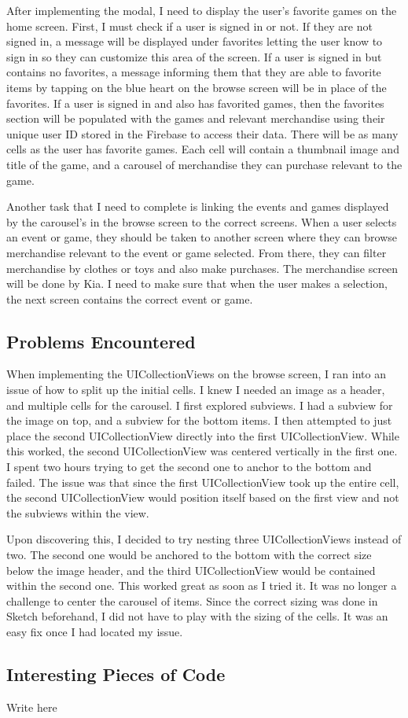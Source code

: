 \documentclass[onecolumn, draftclsnofoot,10pt, compsoc]{IEEEtran}
\begin{document}
\par After implementing the modal, I need to display the user’s favorite games on the home screen. First, I must check if a user is signed in or not. If they are not signed in, a message will be displayed under favorites letting the user know to sign in so they can customize this area of the screen. If a user is signed in but contains no favorites, a message informing them that they are able to favorite items by tapping on the blue heart on the browse screen will be in place of the favorites. If a user is signed in and also has favorited games, then the favorites section will be populated with the games and relevant merchandise using their unique user ID stored in the Firebase to access their data. There will be as many cells as the user has favorite games. Each cell will contain a thumbnail image and title of the game, and a carousel of merchandise they can purchase relevant to the game.

\par Another task that I need to complete is linking the events and games displayed by the carousel’s in the browse screen to the correct screens. When a user selects an event or game, they should be taken to another screen where they can browse merchandise relevant to the event or game selected. From there, they can filter merchandise by clothes or toys and also make purchases. The merchandise screen will be done by Kia. I need to make sure that when the user makes a selection, the next screen contains the correct event or game.

\subsection{Problems Encountered}
When implementing the UICollectionViews on the browse screen, I ran into an issue of how to split up the initial cells. I knew I needed an image as a header, and multiple cells for the carousel. I first explored subviews. I had a subview for the image on top, and a subview for the bottom items. I then attempted to just place the second UICollectionView directly into the first UICollectionView. While this worked, the second UICollectionView was centered vertically in the first one. I spent two hours trying to get the second one to anchor to the bottom and failed. The issue was that since the first UICollectionView took up the entire cell, the second UICollectionView would position itself based on the first view and not the subviews within the view.

\par Upon discovering this, I decided to try nesting three UICollectionViews instead of two. The second one would be anchored to the bottom with the correct size below the image header, and the third UICollectionView would be contained within the second one. This worked great as soon as I tried it. It was no longer a challenge to center the carousel of items. Since the correct sizing was done in Sketch beforehand, I did not have to play with the sizing of the cells. It was an easy fix once I had located my issue.

\subsection{Interesting Pieces of Code}
Write here

\subsection{}
\end{document}
